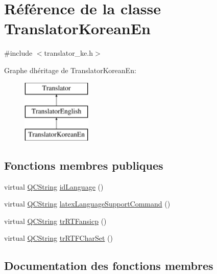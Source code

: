 \hypertarget{class_translator_korean_en}{}\section{Référence de la classe Translator\+Korean\+En}
\label{class_translator_korean_en}


{\ttfamily \#include $<$translator\+\_\+ke.\+h$>$}

Graphe d\textquotesingle{}héritage de Translator\+Korean\+En\+:\begin{figure}[H]
\begin{center}
\leavevmode
\includegraphics[height=3.000000cm]{class_translator_korean_en}
\end{center}
\end{figure}
\subsection*{Fonctions membres publiques}
\begin{DoxyCompactItemize}
\item 
virtual \hyperlink{class_q_c_string}{Q\+C\+String} \hyperlink{class_translator_korean_en_a255647e0edbc0550871133c143cc08a7}{id\+Language} ()
\item 
virtual \hyperlink{class_q_c_string}{Q\+C\+String} \hyperlink{class_translator_korean_en_a0db5fe9ae0843e3f89b0b9770ba32d32}{latex\+Language\+Support\+Command} ()
\item 
virtual \hyperlink{class_q_c_string}{Q\+C\+String} \hyperlink{class_translator_korean_en_ac60d57743cc1cd0a7b6bc6c57a445b7e}{tr\+R\+T\+Fansicp} ()
\item 
virtual \hyperlink{class_q_c_string}{Q\+C\+String} \hyperlink{class_translator_korean_en_ad0ac561385e4e2583eb5f3aaf5303f4d}{tr\+R\+T\+F\+Char\+Set} ()
\end{DoxyCompactItemize}


\subsection{Documentation des fonctions membres}
\hypertarget{class_translator_korean_en_a255647e0edbc0550871133c143cc08a7}{}
